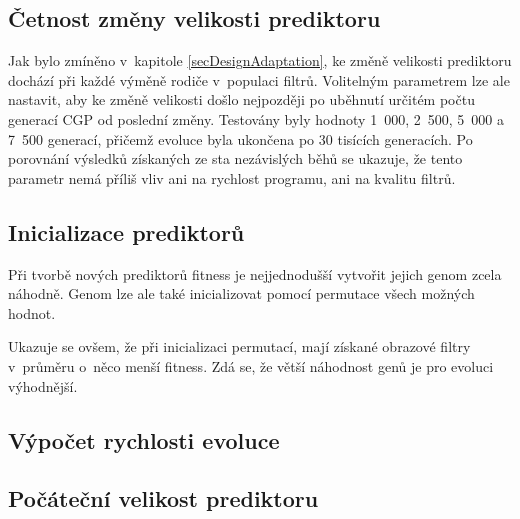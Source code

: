 \subsection{Četnost změny velikosti prediktoru}

Jak bylo zmíněno v~kapitole \ref{secDesignAdaptation}, ke změně velikosti prediktoru dochází při každé výměně rodiče v~populaci filtrů. Volitelným parametrem lze ale nastavit, aby ke změně velikosti došlo nejpozději po uběhnutí určitém počtu generací CGP od poslední změny. Testovány byly hodnoty 1~000, 2~500, 5~000 a 7~500 generací, přičemž evoluce byla ukončena po 30 tisících generacích. Po porovnání výsledků získaných ze sta nezávislých běhů se ukazuje, že tento parametr nemá příliš vliv ani na rychlost programu, ani na kvalitu filtrů.


\subsection{Inicializace prediktorů}

Při tvorbě nových prediktorů fitness je nejjednodušší vytvořit jejich genom zcela náhodně.  Genom lze ale také inicializovat pomocí permutace všech možných hodnot.

Ukazuje se ovšem, že při inicializaci permutací, mají získané obrazové filtry v~průměru o~něco menší fitness. Zdá se, že větší náhodnost genů je pro evoluci výhodnější.


\subsection{Výpočet rychlosti evoluce}


\subsection{Počáteční velikost prediktoru}



